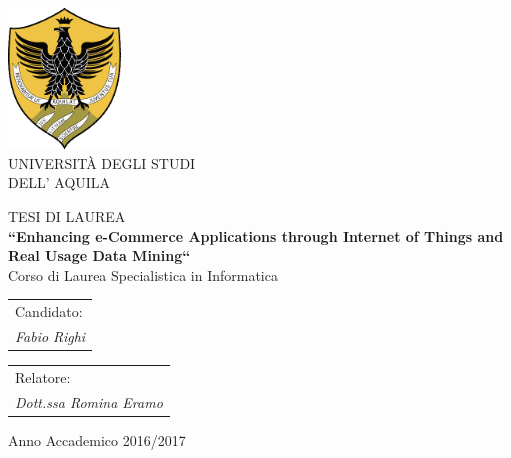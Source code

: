 


\thispagestyle{empty}
\begin{center}

        \includegraphics[width=3cm]{images/logo}\\
\vspace{1cm}
       {\Huge UNIVERSIT\`A DEGLI STUDI}\\
        \vspace{8mm}                                                  %
        {\Huge DELL' AQUILA}\\
        \vspace{1.3cm}
        \vspace{2.2cm}

         {\Large TESI DI LAUREA} \\

        \vspace{8mm}
        {\LARGE \bfseries ``Enhancing e-Commerce Applications through Internet of Things and Real Usage Data Mining``} \\
        \vspace{2.8cm}
        {\large Corso di Laurea Specialistica in Informatica}\\
        \vspace{18mm}
    \end{center}
\vspace{20mm}
   \begin{tabular}{l}
        { Candidato:}\\
        { \textit{Fabio Righi}}\\
      \end{tabular}
    \hfill
    \begin{tabular}{l}
        { Relatore:}\\
        { \textit{Dott.ssa  Romina Eramo}}\\
    \end{tabular}
\vspace{10mm}
\begin{center}
{\large Anno Accademico 2016/2017}
\end{center}
